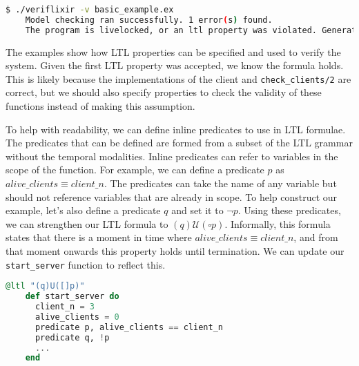 \begin{lstlisting}[language=bash, xleftmargin=.1\linewidth]
    $ ./veriflixir -v basic_example.ex
    Model checking ran successfully. 1 error(s) found.
    The program is livelocked, or an ltl property was violated. Generating trace.
\end{lstlisting}
The examples show how LTL properties can be specified and used to verify the system. Given the first LTL property was accepted, we know the formula holds. This is likely because the implementations of the client and \texttt{check\_clients/2} are correct, but we should also specify properties to check the validity of these functions instead of making this assumption.
\par
To help with readability, we can define inline predicates to use in LTL formulae. The predicates that can be defined are formed from a subset of the LTL grammar without the temporal modalities. Inline predicates can refer to variables in the scope of the function. For example, we can define a predicate \( p \) as $alive\_clients \equiv client\_n$. The predicates can take the name of any variable but should not reference variables that are already in scope. To help construct our example, let's also define a predicate \( q \) and set it to \( \neg p \). Using these predicates, we can strengthen our LTL formula to \( (q) \mathcal{U} (\square p) \). Informally, this formula states that there is a moment in time where $alive\_clients \equiv client\_n$, and from that moment onwards this property holds until termination. We can update our \texttt{start\_server} function to reflect this.
\begin{lstlisting}[language=Elixir, xleftmargin=.3\linewidth]
    @ltl "(q)U([]p)"
    def start_server do
      client_n = 3
      alive_clients = 0
      predicate p, alive_clients == client_n
      predicate q, !p
      ...
    end
\end{lstlisting}
